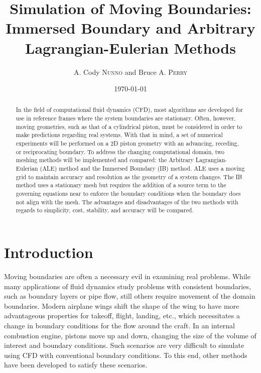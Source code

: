 \documentclass{article}
\title{Simulation of Moving Boundaries: Immersed Boundary and Arbitrary Lagrangian-Eulerian Methods} %
\author{A. Cody \textsc{Nunno} and Bruce A. \textsc{Perry}} %
\date{\today} %
\begin{document}
\maketitle %


\begin{abstract}
  In the field of computational fluid dynamics (CFD), most algorithms are developed for use in reference frames where the system boundaries are stationary.  Often, however, moving geometries, such as that of a cylindrical piston, must be considered in order to make predictions regarding real systems.  With that in mind, a set of numerical experiments will be performed on a 2D piston geometry with an advancing, receding, or reciprocating boundary.  To address the changing computational domain, two meshing methods will be implemented and compared: the Arbitrary Lagrangian-Eulerian (ALE) method and the Immersed Boundary (IB) method.  ALE uses a moving grid to maintain accuracy and resolution as the geometry of a system changes.  The IB method uses a stationary mesh but requires the addition of a source term to the governing equations near to enforce the boundary conditions when the boundary does not align with the mesh. The advantages and disadvantages of the two methods with regards to simplicity, cost, stability, and accuracy will be compared.
\end{abstract}


\section{Introduction}

Moving boundaries are often a necessary evil in examining real problems.  While many applications of fluid dynamics study problems with consistent boundaries, such as boundary layers or pipe flow, still others require movement of the domain boundaries.  Modern airplane wings shift the shape of the wing to have more advantageous properties for takeoff, flight, landing, etc., which necessitates a change in boundary conditions for the flow around the craft.  In an internal combustion engine, pistons move up and down, changing the size of the volume of interest and boundary conditions.  Such scenarios are very difficult to simulate using CFD with conventional boundary conditions.  To this end, other methods have been developed to satisfy these scenarios.
\end{document}
